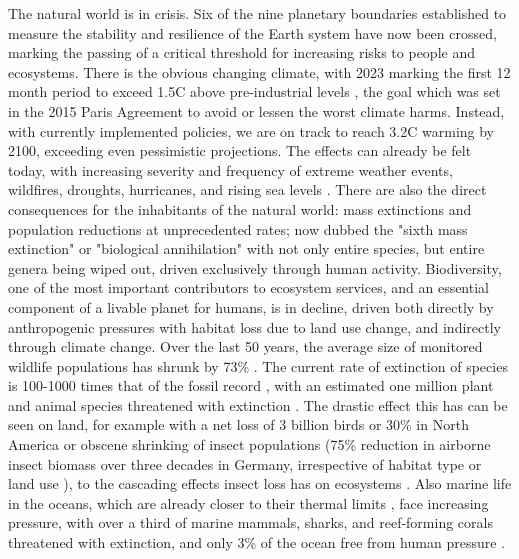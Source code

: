 The natural world is in crisis. 
Six of the nine planetary boundaries \cite{Richardson2023} established to measure the stability and resilience of the Earth system have now been crossed, marking the passing of a critical threshold for increasing risks to people and ecosystems.
There is the obvious changing climate, with 2023 marking the first 12 month period to exceed 1.5\degree C above pre-industrial levels \cite{Service2024}, the goal which was set in the 2015 Paris Agreement \cite{Delbeke2019} to avoid or lessen the worst climate harms. Instead, with currently implemented policies, we are on track to reach 3.2\degree C \cite{Report2023} warming by 2100, exceeding even pessimistic projections. The effects can already be felt today, with increasing severity and frequency of extreme weather events, wildfires, droughts, hurricanes, and rising sea levels \cite{Report2023}. 
There are also the direct consequences for the inhabitants of the natural world: mass extinctions and population reductions at unprecedented rates; now dubbed the "sixth mass extinction" \cite{Ceballos2015} or "biological annihilation" \cite{Ceballos2017} with not only entire species, but entire genera being wiped out\cite{Ceballos2023}, driven exclusively through human activity. Biodiversity, one of the most important contributors to ecosystem services, and an essential component of a livable planet for humans, is in decline, driven both directly by anthropogenic pressures with habitat loss due to land use change, and indirectly through climate change. Over the last 50 years, the average size of monitored wildlife populations has shrunk by 73\% \cite{WWF2024}. The current rate of extinction of species is 100-1000 times that of the fossil record \cite{Pimm2014, Ceballos2015}, with an estimated one million plant and animal species threatened with extinction \cite{ipbes2019}.
The drastic effect this has can be seen on land, for example with a net loss of 3 billion birds or 30\% in North America \cite{Rosenberg2019} or obscene shrinking of insect populations (75\% reduction in airborne insect biomass over three decades in Germany, irrespective of habitat type or land use \cite{Hallmann2017}), to the cascading effects insect loss has on ecosystems \cite{Kehoe2021}. Also marine life in the oceans, which are already closer to their thermal limits \cite{Pinsky2019}, face increasing pressure, with over a third of marine mammals, sharks, and reef-forming corals threatened with extinction, and only 3\% of the ocean free from human pressure \cite{ipbes2019}.

